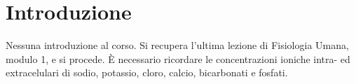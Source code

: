 \chapter*{Introduzione}
Nessuna introduzione al corso. Si recupera l'ultima lezione di Fisiologia Umana, modulo 1, e si procede. \`{E} necessario ricordare le concentrazioni ioniche intra- ed extracelulari di sodio, potassio, cloro, calcio, bicarbonati e fosfati. 

\newpage
\thispagestyle{empty}